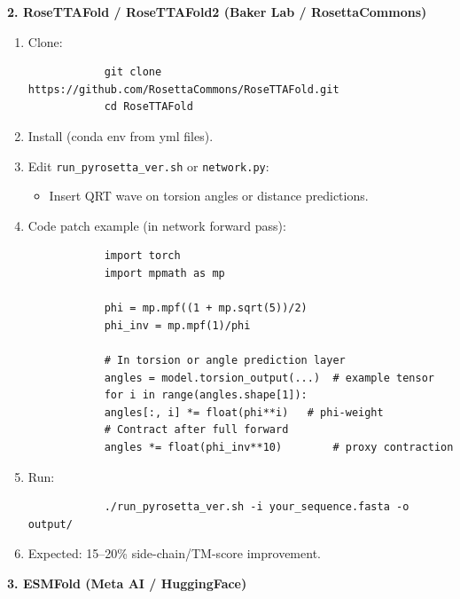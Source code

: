 \documentclass[11pt,a4paper,oneside]{article}
\begin{document}
	\textbf{2. RoseTTAFold / RoseTTAFold2 (Baker Lab / RosettaCommons)}

	\begin{enumerate}
		\item Clone:
		\begin{verbatim}
			git clone https://github.com/RosettaCommons/RoseTTAFold.git
			cd RoseTTAFold
		\end{verbatim}
		\item Install (conda env from yml files).
		\item Edit \texttt{run\_pyrosetta\_ver.sh} or \texttt{network.py}:
		\begin{itemize}
			\item Insert QRT wave on torsion angles or distance predictions.
		\end{itemize}
		\item Code patch example (in network forward pass):
		\begin{lstlisting}
			import torch
			import mpmath as mp

			phi = mp.mpf((1 + mp.sqrt(5))/2)
			phi_inv = mp.mpf(1)/phi

			# In torsion or angle prediction layer
			angles = model.torsion_output(...)  # example tensor
			for i in range(angles.shape[1]):
			angles[:, i] *= float(phi**i)   # phi-weight
			# Contract after full forward
			angles *= float(phi_inv**10)        # proxy contraction
		\end{lstlisting}
		\item Run:
		\begin{verbatim}
			./run_pyrosetta_ver.sh -i your_sequence.fasta -o output/
		\end{verbatim}
		\item Expected: 15--20\% side-chain/TM-score improvement.
	\end{enumerate}

	\textbf{3. ESMFold (Meta AI / HuggingFace)}
\end{document}
